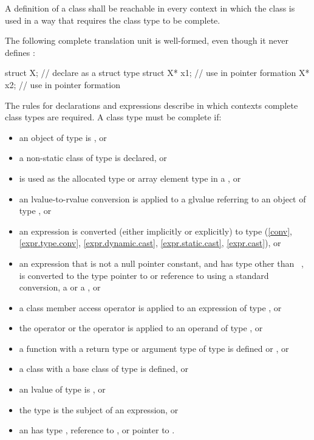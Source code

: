 \pnum
{}%
A definition of a class shall be reachable in every context in which
the class is used in a way that requires the class type to be complete.
\begin{example}
The following complete translation unit is well-formed,
even though it never defines :
\begin{codeblock}
struct X;                       // declare  as a struct type
struct X* x1;                   // use  in pointer formation
X* x2;                          // use  in pointer formation
\end{codeblock}
\end{example}
\begin{note}
The rules for declarations and expressions
describe in which contexts complete class types are required. A class
type  must be complete if:
\begin{itemize}
\item an object of type  is , or
\item a non-static class  of
type  is declared, or
\item {} is used as the allocated type or array element type in a
, or
\item an lvalue-to-rvalue conversion is applied to
a glvalue referring
to an object of type , or
\item an expression is converted (either implicitly or explicitly) to
type  (\ref{conv}, \ref{expr.type.conv},
\ref{expr.dynamic.cast}, \ref{expr.static.cast}, \ref{expr.cast}), or
\item an expression that is not a null pointer constant, and has type
other than \cv{}~, is converted to the type pointer to 
or reference to  using a standard conversion,
a  or
a , or
\item a class member access operator is applied to an expression of type
, or
\item the  operator or the
 operator is applied to an operand of
type , or
\item a function with a return type or argument type of type 
is defined or , or
\item a class with a base class of type  is
defined, or
\item an lvalue of type  is , or
\item the type  is the subject of an
 expression, or
\item an  has type , reference to
, or pointer to .
\end{itemize}
\end{note}

